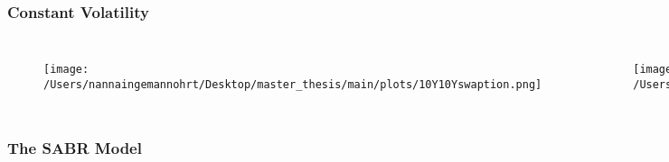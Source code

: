 \documentclass{beamer}
\begin{document}
\begin{frame}
    \frametitle{\textcolor{KUrod}{Constant Volatility}}
    \begin{columns}
        \begin{figure}
            \texttt{[image: /Users/nannaingemannohrt/Desktop/master\_thesis/main/plots/10Y10Yswaption.png]}
        \end{figure}
        
        \begin{figure}
            \texttt{[image: /Users/nannaingemannohrt/Desktop/master\_thesis/main/plots/10Y10Yswaptionreturn.png]}
        \end{figure}

        \begin{figure}
            \texttt{[image: /Users/nannaingemannohrt/Desktop/master\_thesis/main/plots/sp500.png]}
        \end{figure}
        
        \begin{figure}
            \texttt{[image: /Users/nannaingemannohrt/Desktop/master\_thesis/main/plots/sp500return.png]}
        \end{figure}
    \end{columns}

\end{frame}

\begin{frame}
    \frametitle{\textcolor{KUrod}{The SABR Model}}
\end{frame}
\end{document}
